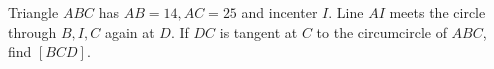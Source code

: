 Triangle $ABC$ has $AB=14,AC=25$ and incenter $I$. Line $AI$ meets the circle through $B,I,C$ again at $D$. If $DC$ is tangent at $C$ to the circumcircle of $ABC$, find $[BCD]$.
